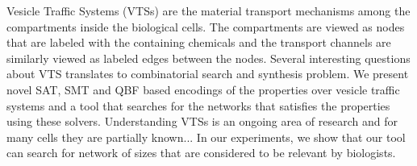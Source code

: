 Vesicle Traffic Systems (VTSs) are the material transport
mechanisms among the compartments inside the biological cells.
%
The compartments are viewed as nodes that are labeled with the
containing chemicals and the transport channels
are similarly viewed as labeled edges between the nodes.
%
Several interesting questions about VTS translates to combinatorial
search and synthesis problem. 
%
We present novel SAT, SMT and QBF based encodings of the properties
over vesicle traffic systems and a tool that searches for the networks
that satisfies the properties using these solvers. 
%
Understanding VTSs is an ongoing area of research and for many cells
they are partially known...
%
In our experiments, we show that our tool can search for network of sizes that are considered
to be relevant by biologists.


